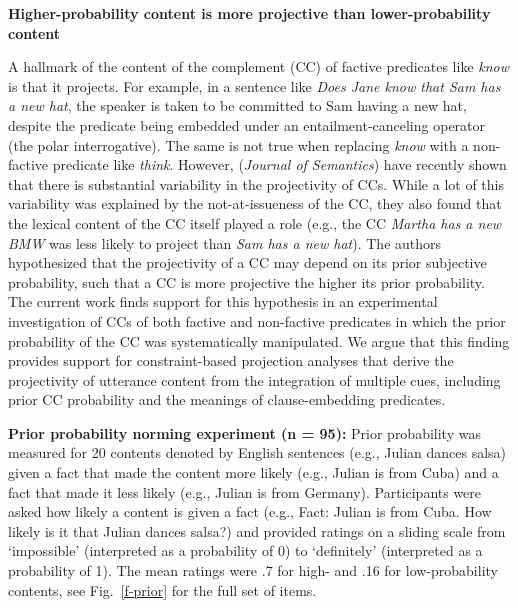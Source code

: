 \documentclass[12pt,fleqn]{article}
\newcommand{\6}{\mbox{$[\hspace*{-.6mm}[$}}
\newcommand{\9}{\mbox{$]\hspace*{-.6mm}]$}}
\begin{document}
  
\begin{center}
{\bf Higher-probability content is more projective than lower-probability content}
\end{center}

\vspace*{-.3cm}

\noindent
A hallmark of the content of the complement (CC) of factive predicates like {\em know}  is that it projects. For example, in a sentence like \emph{Does Jane know that Sam has a new hat}, the speaker is taken to be committed to Sam having a new hat, despite the predicate being embedded under an entailment-canceling operator (the polar interrogative). The same is not true when replacing \emph{know} with a non-factive predicate like \emph{think}. However,  \citealt*{tbd-variability} ({\em Journal of Semantics}) have recently shown that there is substantial variability in the projectivity of CCs. While a lot of this variability was explained by the not-at-issueness of the CC, they also found that the lexical content of the CC itself played a role (e.g., the CC \emph{Martha has a new BMW} was less likely to project than \emph{Sam has a new hat}). The authors hypothesized that the projectivity of a CC may depend on its prior subjective probability, such that a CC is more projective the higher its prior probability. The current work finds support for this hypothesis in an experimental investigation of CCs of both factive and non-factive predicates in which the prior probability of the CC was systematically manipulated. We argue that this finding provides support for constraint-based projection analyses that derive the projectivity of utterance content from the integration of multiple cues, including prior CC probability and the meanings of clause-embedding predicates.


\noindent
{\bf Prior probability norming experiment (n = 95):} Prior probability was measured for 20 contents denoted by English sentences (e.g., Julian dances salsa) given a fact that made the content more likely (e.g., Julian is from Cuba) and a fact that made it less likely (e.g., Julian is from Germany). Participants were asked how likely a content is given a fact (e.g., Fact: Julian is from Cuba. How likely is it that Julian dances salsa?) and provided ratings on a sliding scale from `impossible' (interpreted as a probability of 0) to `definitely' (interpreted as a probability of 1). The mean ratings were .7 for high- and .16 for low-probability contents, see Fig.~\ref{f-prior} for the full set of items.
\end{document}
